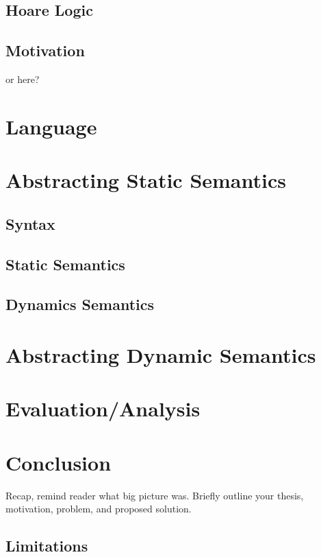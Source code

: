 \section{Hoare Logic}

\section{Motivation}
or here?


\chapter{Language}


\chapter{Abstracting Static Semantics}

\section{Syntax}

\section{Static Semantics}

\section{Dynamics Semantics}


\chapter{Abstracting Dynamic Semantics}


\chapter{Evaluation/Analysis}



\chapter{Conclusion}
Recap, remind reader what big picture was.
Briefly outline your thesis, motivation, problem, and proposed solution.

\section{Limitations}

